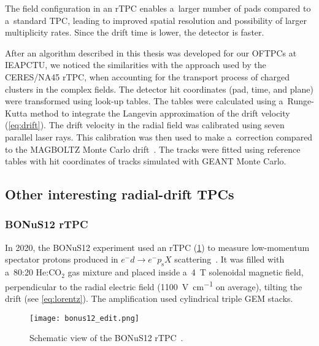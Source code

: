 			The field configuration in an \ac{rTPC} enables a~larger number of pads compared to a~standard \ac{TPC}, leading to improved spatial resolution and possibility of larger multiplicity rates. Since the drift time is lower, the detector is faster.
			
			After an algorithm described in this thesis was developed for our \acp{OFTPC} at \ac{IEAPCTU}, we noticed the similarities with the approach used by the CERES/NA45 \ac{rTPC}, when accounting for the transport process of charged clusters in the complex fields. The detector hit coordinates (pad, time, and plane) were transformed using look\nobreakdash-up tables. The tables were calculated using a~Runge-Kutta method to integrate the Langevin approximation of the drift velocity (\cref{eq:drift}). The drift velocity in the radial field was calibrated using seven parallel laser rays. This calibration was then used to make a~correction compared to the MAGBOLTZ Monte Carlo drift~\cite{magboltz}. The tracks were fitted using reference tables with hit coordinates of tracks simulated with GEANT Monte Carlo.
			
		\subsection{Other interesting radial-drift TPCs}
			\subsubsection{BONuS12 rTPC}
				In 2020, the \acf{BONuS12} experiment used an \ac{rTPC} (\cref{fig:bonus}) to measure low-momentum spectator protons produced in $e^- d \rightarrow e^- p_\text{s}X$ scattering~\cite{bonus}. It was filled with a~80:20 He:CO$_2$ gas mixture and placed inside a~\qty{4}{\tesla} solenoidal magnetic field, perpendicular to the radial electric field (\qty{1100}{\V\per\cm} on average), tilting the drift (see \cref{eq:lorentz}). The amplification used cylindrical triple \ac{GEM} stacks.
				
				\begin{figure}
					\centering
					\texttt{[image: bonus12\_edit.png]}
					\caption{Schematic view of the \ac{BONuS12} \ac{rTPC}~\cite{bonus}.}
					\label{fig:bonus}
				\end{figure}
				
